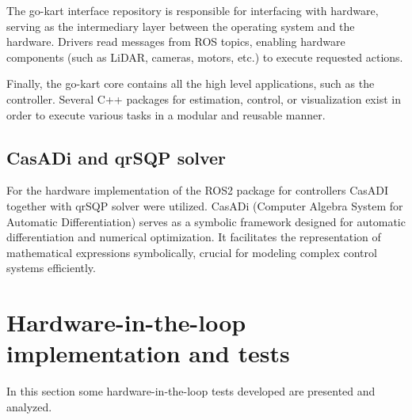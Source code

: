 \documentclass[a4paper,12pt,oneside]{book}
\begin{document}
The go-kart interface repository is responsible for interfacing with hardware, serving as the intermediary layer between the operating system and the hardware. 
Drivers read messages from ROS topics, enabling hardware components (such as LiDAR, cameras, motors, etc.) to execute requested actions.

Finally, the go-kart core contains all the high level applications, such as the controller. 
Several C++ packages for estimation, control, or visualization exist in order to execute various tasks in a modular and reusable manner.

\subsection*{CasADi and qrSQP solver}
For the hardware implementation of the ROS2 package for controllers CasADI together with qrSQP solver were utilized.
CasADi (Computer Algebra System for Automatic Differentiation) \cite{Andersson2018} serves as a symbolic framework designed for automatic differentiation and numerical optimization.
It facilitates the representation of mathematical expressions symbolically, crucial for modeling complex control systems efficiently.



\section{Hardware-in-the-loop implementation and tests}
In this section some hardware-in-the-loop tests developed are presented and analyzed.
\end{document}
